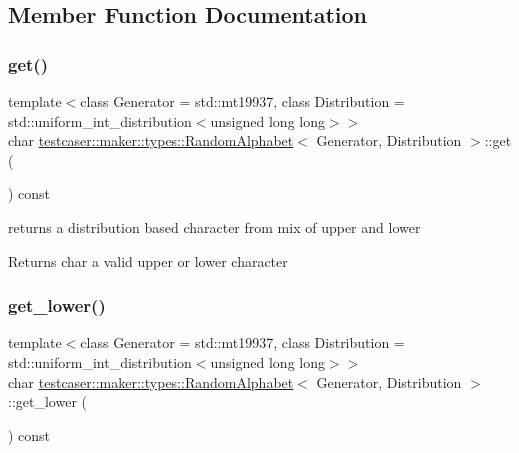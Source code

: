 \subsection{Member Function Documentation}
\mbox{\label{structtestcaser_1_1maker_1_1types_1_1RandomAlphabet_a6498f1e44b84cb66c1c1dc6de642b218}} 
\subsubsection{\texorpdfstring{get()}{get()}}
{\footnotesize\ttfamily template$<$class Generator = std\+::mt19937, class Distribution = std\+::uniform\+\_\+int\+\_\+distribution$<$unsigned long long$>$$>$ \\
char \mbox{\hyperlink{structtestcaser_1_1maker_1_1types_1_1RandomAlphabet}{testcaser\+::maker\+::types\+::\+Random\+Alphabet}}$<$ Generator, Distribution $>$\+::get (\begin{DoxyParamCaption}{ }\end{DoxyParamCaption}) const\hspace{0.3cm}{\ttfamily [inline]}}



returns a distribution based character from mix of upper and lower 

\begin{DoxyReturn}{Returns}
char a valid upper or lower character 
\end{DoxyReturn}
\mbox{\label{structtestcaser_1_1maker_1_1types_1_1RandomAlphabet_a6fccb771852c1f44ed268a9867589026}} 
\subsubsection{\texorpdfstring{get\_lower()}{get\_lower()}}
{\footnotesize\ttfamily template$<$class Generator = std\+::mt19937, class Distribution = std\+::uniform\+\_\+int\+\_\+distribution$<$unsigned long long$>$$>$ \\
char \mbox{\hyperlink{structtestcaser_1_1maker_1_1types_1_1RandomAlphabet}{testcaser\+::maker\+::types\+::\+Random\+Alphabet}}$<$ Generator, Distribution $>$\+::get\+\_\+lower (\begin{DoxyParamCaption}{ }\end{DoxyParamCaption}) const\hspace{0.3cm}{\ttfamily [inline]}}



